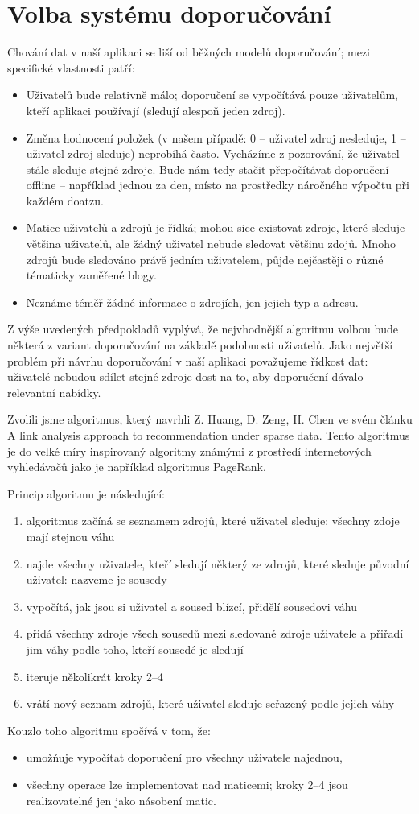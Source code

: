 \section{Volba systému doporučování}

Chování dat v naší aplikaci se liší od běžných modelů doporučování; mezi specifické vlastnosti patří:

\begin{itemize}
    \item Uživatelů bude relativně málo; doporučení se vypočítává pouze uživatelům, kteří aplikaci používají (sledují alespoň jeden zdroj).
    \item Změna hodnocení položek (v našem případě: 0 -- uživatel zdroj nesleduje, 1 -- uživatel zdroj sleduje) neprobíhá často.
        Vycházíme z pozorování, že uživatel stále sleduje stejné zdroje.
        Bude nám tedy stačit přepočítávat doporučení offline -- například jednou za den, místo na prostředky náročného výpočtu při každém doatzu.
    \item Matice uživatelů a zdrojů je řídká; mohou sice existovat zdroje, které sleduje většina uživatelů, ale žádný uživatel nebude sledovat většinu zdojů.
        Mnoho zdrojů bude sledováno právě jedním uživatelem, půjde nejčastěji o různé tématicky zaměřené blogy.
    \item Neznáme téměř žádné informace o zdrojích, jen jejich typ a adresu.
\end{itemize}

Z výše uvedených předpokladů vyplývá, že nejvhodnější algoritmu volbou bude některá z variant doporučování na základě podobnosti uživatelů.
Jako největší problém při návrhu doporučování v naší aplikaci považujeme řídkost dat: uživatelé nebudou sdílet stejné zdroje dost na to, aby doporučení dávalo relevantní nabídky.

Zvolili jsme algoritmus, který navrhli Z. Huang, D. Zeng, H. Chen ve svém článku A link analysis approach to recommendation under sparse data.
Tento algoritmus je do velké míry inspirovaný algoritmy známými z prostředí internetových vyhledávačů jako je například algoritmus PageRank.

Princip algoritmu je následující:
\begin{enumerate}
    \item algoritmus začíná se seznamem zdrojů, které uživatel sleduje; všechny zdoje mají stejnou váhu
    \item najde všechny uživatele, kteří sledují některý ze zdrojů, které sleduje původní uživatel: nazveme je sousedy
    \item vypočítá, jak jsou si uživatel a soused blízcí, přidělí sousedovi váhu
    \item přidá všechny zdroje všech sousedů mezi sledované zdroje uživatele a přiřadí jim váhy podle toho, kteří sousedé je sledují
    \item iteruje několikrát kroky 2--4
    \item vrátí nový seznam zdrojů, které uživatel sleduje seřazený podle jejich váhy
\end{enumerate}

Kouzlo toho algoritmu spočívá v tom, že:
\begin{itemize}
    \item umožňuje vypočítat doporučení pro všechny uživatele najednou,
    \item všechny operace lze implementovat nad maticemi; kroky 2--4 jsou realizovatelné jen jako násobení matic.
\end{itemize}

